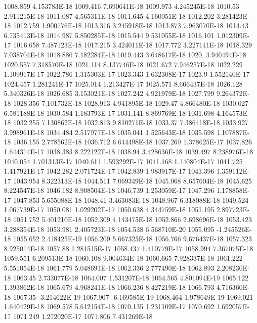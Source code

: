 1008.859  4.153783E-18
1009.416  7.690641E-18
1009.973  4.245245E-18
1010.53  2.911215E-18
1011.087  4.565311E-18
1011.645  4.160051E-18
1012.202  3.281423E-18
1012.759  1.900776E-18
1013.316  3.245918E-18
1013.873  7.963070E-18
1014.43  6.735413E-18
1014.987  5.850285E-18
1015.544  9.531055E-18
1016.101  1.012309E-17
1016.658  7.487123E-18
1017.215  3.424011E-18
1017.772  3.227141E-18
1018.329  7.038704E-18
1018.886  7.182284E-18
1019.443  3.648617E-18
1020.  3.940494E-18
1020.557  7.318570E-18
1021.114  8.137746E-18
1021.672  7.946257E-18
1022.229  1.109917E-17
1022.786  1.315303E-17
1023.343  1.632308E-17
1023.9  1.552140E-17
1024.457  1.281241E-17
1025.014  1.213427E-17
1025.571  8.666437E-18
1026.128  5.340326E-18
1026.685  3.153021E-18
1027.242  4.921979E-18
1027.799  9.264372E-18
1028.356  7.101732E-18
1028.913  4.941895E-18
1029.47  4.866480E-18
1030.027  6.581188E-18
1030.584  1.183793E-17
1031.141  8.869769E-18
1031.698  4.164573E-18
1032.255  7.130862E-18
1032.813  9.810271E-18
1033.37  7.386418E-18
1033.927  3.998961E-18
1034.484  2.517977E-18
1035.041  1.525643E-18
1035.598  1.107887E-18
1036.155  2.778562E-18
1036.712  6.644498E-18
1037.269  1.378625E-17
1037.826  1.644314E-17
1038.383  8.222122E-18
1038.94  3.428636E-18
1039.497  8.238976E-18
1040.054  1.701313E-17
1040.611  1.593292E-17
1041.168  1.140804E-17
1041.725  1.417921E-17
1042.282  2.071724E-17
1042.839  1.983917E-17
1043.396  1.359112E-17
1043.954  8.322313E-18
1044.511  7.069349E-18
1045.068  8.657604E-18
1045.625  8.224547E-18
1046.182  8.908504E-18
1046.739  1.253059E-17
1047.296  1.178858E-17
1047.853  5.655088E-18
1048.41  3.463083E-18
1048.967  6.318088E-18
1049.524  1.067739E-17
1050.081  1.029202E-17
1050.638  4.344759E-18
1051.195  2.897723E-18
1051.752  5.401210E-18
1052.309  4.143475E-18
1052.866  2.698696E-18
1053.423  3.288354E-18
1053.981  2.405723E-18
1054.538  6.568710E-20
1055.095  -1.245526E-18
1055.652  2.418425E-19
1056.209  5.667325E-18
1056.766  9.676437E-18
1057.323  8.925014E-18
1057.88  1.281515E-17
1058.437  1.410779E-17
1058.994  7.367075E-18
1059.551  6.209513E-18
1060.108  9.004634E-18
1060.665  7.928337E-18
1061.222  5.551054E-18
1061.779  5.048691E-18
1062.336  2.777490E-18
1062.893  2.208230E-18
1063.45  2.733077E-18
1064.007  1.531207E-18
1064.565  4.801094E-19
1065.122  1.393862E-18
1065.679  4.968241E-18
1066.236  8.427219E-18
1066.793  4.716360E-18
1067.35  -3.214622E-19
1067.907  -6.169585E-19
1068.464  1.978649E-19
1069.021  1.640429E-18
1069.578  5.612154E-18
1070.135  1.231109E-17
1070.692  1.692057E-17
1071.249  1.272020E-17
1071.806  7.431269E-18
